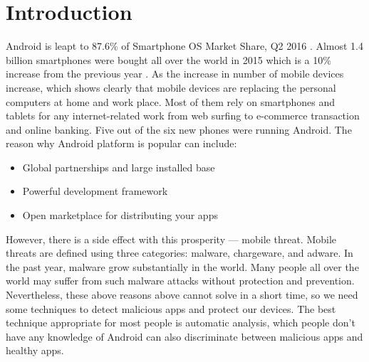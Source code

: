\chapter{Introduction}


Android is leapt to 87.6\% of Smartphone OS Market Share, Q2 2016 \cite{OS}.
Almost 1.4 billion smartphones were bought all over the world in 2015 which is a 10\% increase from the previous year \cite{Symantec}.
As the increase in number of mobile devices increase, which shows clearly that mobile devices are replacing the personal computers at home and work place.
Most of them rely on smartphones and tablets for any internet-related work from web surfing to e-commerce transaction and online banking.
Five out of the six new phones were running Android. 
The reason why Android platform is popular can include:
\begin{itemize}
    \item Global partnerships and large installed base 
    \item Powerful development framework
    \item Open marketplace for distributing your apps
\end{itemize}


However, there is a side effect with this prosperity — mobile threat. 
Mobile threats are defined using three categories: malware, chargeware, and adware. 
In the past year, malware grow substantially in the world.  
Many people all over the world may suffer from such malware attacks without protection and prevention.
Nevertheless, these above reasons above cannot solve in a short time, so we need some techniques to detect malicious apps and protect our devices. 
The best technique appropriate for most people is automatic analysis, which people don’t have any knowledge of Android can also discriminate between malicious apps and healthy apps. 
\nocite{*}